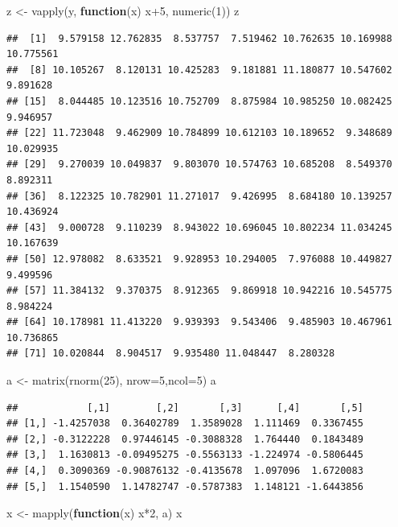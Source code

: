\documentclass[]{article}
\newenvironment{Shaded}{\begin{snugshade}}{\end{snugshade}}
\newcommand{\AttributeTok}[1]{\textcolor[rgb]{0.77,0.63,0.00}{#1}}
\newcommand{\ControlFlowTok}[1]{\textcolor[rgb]{0.13,0.29,0.53}{\textbf{#1}}}
\newcommand{\DecValTok}[1]{\textcolor[rgb]{0.00,0.00,0.81}{#1}}
\newcommand{\FunctionTok}[1]{\textcolor[rgb]{0.00,0.00,0.00}{#1}}
\newcommand{\NormalTok}[1]{#1}
\newcommand{\OtherTok}[1]{\textcolor[rgb]{0.56,0.35,0.01}{#1}}
\newcommand{\SpecialCharTok}[1]{\textcolor[rgb]{0.00,0.00,0.00}{#1}}
\begin{document}
\begin{Shaded}
\begin{Highlighting}[]
\NormalTok{z }\OtherTok{\textless{}{-}} \FunctionTok{vapply}\NormalTok{(y, }\ControlFlowTok{function}\NormalTok{(x) x}\SpecialCharTok{+}\DecValTok{5}\NormalTok{, }\FunctionTok{numeric}\NormalTok{(}\DecValTok{1}\NormalTok{))}
\NormalTok{z}
\end{Highlighting}
\end{Shaded}

\begin{verbatim}
##  [1]  9.579158 12.762835  8.537757  7.519462 10.762635 10.169988 10.775561
##  [8] 10.105267  8.120131 10.425283  9.181881 11.180877 10.547602  9.891628
## [15]  8.044485 10.123516 10.752709  8.875984 10.985250 10.082425  9.946957
## [22] 11.723048  9.462909 10.784899 10.612103 10.189652  9.348689 10.029935
## [29]  9.270039 10.049837  9.803070 10.574763 10.685208  8.549370  8.892311
## [36]  8.122325 10.782901 11.271017  9.426995  8.684180 10.139257 10.436924
## [43]  9.000728  9.110239  8.943022 10.696045 10.802234 11.034245 10.167639
## [50] 12.978082  8.633521  9.928953 10.294005  7.976088 10.449827  9.499596
## [57] 11.384132  9.370375  8.912365  9.869918 10.942216 10.545775  8.984224
## [64] 10.178981 11.413220  9.939393  9.543406  9.485903 10.467961 10.736865
## [71] 10.020844  8.904517  9.935480 11.048447  8.280328
\end{verbatim}

\begin{Shaded}
\begin{Highlighting}[]
\NormalTok{a }\OtherTok{\textless{}{-}} \FunctionTok{matrix}\NormalTok{(}\FunctionTok{rnorm}\NormalTok{(}\DecValTok{25}\NormalTok{), }\AttributeTok{nrow=}\DecValTok{5}\NormalTok{,}\AttributeTok{ncol=}\DecValTok{5}\NormalTok{)}
\NormalTok{a}
\end{Highlighting}
\end{Shaded}

\begin{verbatim}
##            [,1]        [,2]       [,3]      [,4]       [,5]
## [1,] -1.4257038  0.36402789  1.3589028  1.111469  0.3367455
## [2,] -0.3122228  0.97446145 -0.3088328  1.764440  0.1843489
## [3,]  1.1630813 -0.09495275 -0.5563133 -1.224974 -0.5806445
## [4,]  0.3090369 -0.90876132 -0.4135678  1.097096  1.6720083
## [5,]  1.1540590  1.14782747 -0.5787383  1.148121 -1.6443856
\end{verbatim}

\begin{Shaded}
\begin{Highlighting}[]
\NormalTok{x }\OtherTok{\textless{}{-}} \FunctionTok{mapply}\NormalTok{(}\ControlFlowTok{function}\NormalTok{(x) x}\SpecialCharTok{*}\DecValTok{2}\NormalTok{, a)}
\NormalTok{x}
\end{Highlighting}
\end{Shaded}
\end{document}
